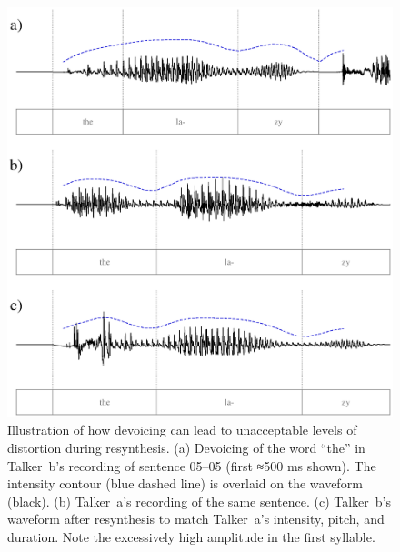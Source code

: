 \begin{figure}
	\begin{centering}
	\includegraphics{figures/devoicing/devoicing.eps}
	\caption[Syllable devoicing in resynthesis]{Illustration of how devoicing can lead to unacceptable levels of distortion during resynthesis.  (a) Devoicing of the word “the” in Talker~\ac{b}’s recording of sentence 05–05 (first ≈500 ms shown).  The intensity contour (blue dashed line) is overlaid on the waveform (black).  (b) Talker~\ac{a}’s recording of the same sentence.  (c) Talker~\ac{b}’s waveform after resynthesis to match Talker~\ac{a}’s intensity, pitch, and duration.  Note the excessively high amplitude in the first syllable.\label{fig:Devoicing}}
	\end{centering}
\end{figure}

